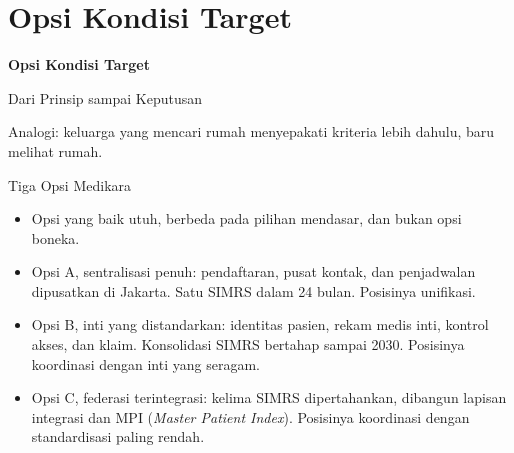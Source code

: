\documentclass[aspectratio=169, table, 12pt]{beamer}
\begin{document}
\section{Opsi Kondisi Target}

\begin{frame}{\hfill}
  \centering
  \Huge{\textbf{Opsi Kondisi Target}}
\end{frame}

\begin{frame}{{\Large Dari Prinsip sampai Keputusan}}
  \centering

  \vspace{4pt}
  {\small Analogi: keluarga yang mencari rumah menyepakati kriteria lebih dahulu, baru melihat rumah.\par}
\end{frame}

\begin{frame}{{\Large Tiga Opsi Medikara}}
  \vspace{6pt}
  \small
  \begin{itemize}
    \item Opsi yang baik utuh, berbeda pada pilihan mendasar, dan bukan opsi boneka.
    \item Opsi A, sentralisasi penuh: pendaftaran, pusat kontak, dan penjadwalan dipusatkan di Jakarta.
          Satu SIMRS dalam 24 bulan. Posisinya unifikasi.
    \item Opsi B, inti yang distandarkan: identitas pasien, rekam medis inti, kontrol akses, dan klaim.
          Konsolidasi SIMRS bertahap sampai 2030. Posisinya koordinasi dengan inti yang seragam.
    \item Opsi C, federasi terintegrasi: kelima SIMRS dipertahankan, dibangun lapisan integrasi dan MPI
          (\textit{Master Patient Index}). Posisinya koordinasi dengan standardisasi paling rendah.
  \end{itemize}
\end{frame}
\end{document}
